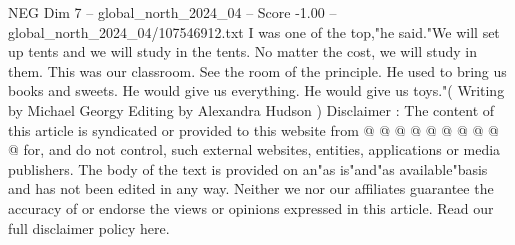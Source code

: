 \begin{textsample}{NEG Dim 7 – global\_north\_2024\_04 – Score -1.00 – global\_north\_2024\_04/107546912.txt}
I was one of the top,"he said."We will set up tents and we will study in the tents.
No matter the cost, we will study in them.
This was our classroom.
See the room of the principle.
He used to bring us books and sweets.
He would give us everything.
He would give us toys."( Writing by Michael Georgy Editing by Alexandra Hudson ) Disclaimer : The content of this article is syndicated or provided to this website from @ @ @ @ @ @ @ @ @ @ for, and do not control, such external websites, entities, applications or media publishers.
The body of the text is provided on an"as is"and"as available"basis and has not been edited in any way.
Neither we nor our affiliates guarantee the accuracy of or endorse the views or opinions expressed in this article.
Read our full disclaimer policy here.

\end{textsample}
